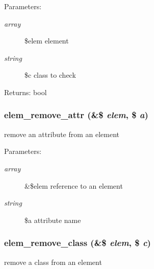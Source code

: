 \begin{Desc}
\item[Parameters:]
\begin{description}
\item[{\em array}]\$elem element \item[{\em string}]\$c class to check \end{description}
\end{Desc}
\begin{Desc}
\item[Returns:]bool \end{Desc}
\hypertarget{html_8inc_8php_eb7074172d9164f69e64967b6bcdc643}{
\subsubsection[{elem\_\-remove\_\-attr}]{\setlength{\rightskip}{0pt plus 5cm}elem\_\-remove\_\-attr (\&\$ {\em elem}, \/  \$ {\em a})}}
\label{html_8inc_8php_eb7074172d9164f69e64967b6bcdc643}


remove an attribute from an element

\begin{Desc}
\item[Parameters:]
\begin{description}
\item[{\em array}]\&\$elem reference to an element \item[{\em string}]\$a attribute name \end{description}
\end{Desc}
\hypertarget{html_8inc_8php_6a224914e8f32176ca11a31154b1ae13}{
\subsubsection[{elem\_\-remove\_\-class}]{\setlength{\rightskip}{0pt plus 5cm}elem\_\-remove\_\-class (\&\$ {\em elem}, \/  \$ {\em c})}}
\label{html_8inc_8php_6a224914e8f32176ca11a31154b1ae13}


remove a class from an element

